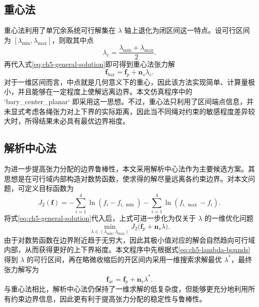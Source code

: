 \subsection{重心法}

重心法利用了单冗余系统可行解集在 $\lambda$ 轴上退化为闭区间这一特点。设可行区间为 $[\lambda_{\min},\lambda_{\max}]$，则取其中点
\begin{equation}
  \lambda_c=\frac{\lambda_{\min}+\lambda_{\max}}{2}. \label{eq:ch5-barycenter-lambda}
\end{equation}
再代入式\eqref{eq:ch5-general-solution}即可得到重心法张力解
\begin{equation}
  \bm f_{\mathrm{bar}}=\bm f_p+\bm n_s\lambda_c. \label{eq:ch5-barycenter-force}
\end{equation}
对于一维区间而言，中点就是几何意义下的重心，因此该方法实现简单、计算量极小，并且能够在一定程度上使解远离边界。本文仿真程序中的 `bary\_center\_planar` 即采用这一思想\cite{tao2021tensiondistribution}。不过，重心法只利用了区间端点信息，并未显式考虑各绳张力对上下界的实际距离，因此当不同绳对约束的敏感程度差异较大时，所得结果未必具有最优边界裕度。

\subsection{解析中心法}

为进一步提高张力分配的边界鲁棒性，本文采用解析中心法作为主要候选方案。其思想是在可行域内部构造对数势函数，使求得的解尽量远离各约束边界。对本文问题，可定义目标函数为
\begin{equation}
  J_2(\bm f)=-\sum_{i=1}^{4}\ln\left(f_i-f_{i,\min}\right)-\sum_{i=1}^{4}\ln\left(f_{i,\max}-f_i\right). \label{eq:ch5-barrier}
\end{equation}
将式\eqref{eq:ch5-general-solution}代入后，上式可进一步化为仅关于 $\lambda$ 的一维优化问题
\begin{equation}
  \min_{\lambda\in(\lambda_{\min},\lambda_{\max})} J_2\bigl(\bm f_p+\bm n_s\lambda\bigr). \label{eq:ch5-barrier-lambda}
\end{equation}
由于对数势函数在边界附近趋于无穷大，因此其极小值对应的解会自然趋向可行域内部，从而获得更好的上下界裕度。本文程序中先根据式\eqref{eq:ch5-lambda-bounds}得到 $\lambda$ 的可行区间，再在略微收缩后的开区间内采用一维搜索求解最优 $\lambda^\ast$，最终张力解写为
\begin{equation}
  \bm f_{\mathrm{ac}}=\bm f_p+\bm n_s\lambda^\ast. \label{eq:ch5-ac-force}
\end{equation}
与重心法相比，解析中心法仍保持了一维求解的低复杂度，但能够更充分地利用所有约束边界信息，因此更有利于提高张力分配的稳定性与鲁棒性\cite{cao2023realtimetension,song2024realtimemethod,wang2024dynamictension}。

